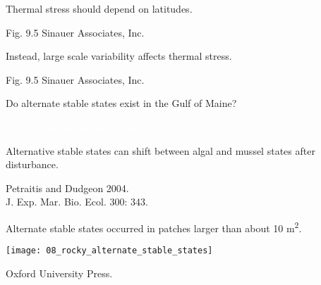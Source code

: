 \documentclass[t]{beamer}
\begin{document}
{
\begin{frame}[b]{Thermal stress should depend on latitudes.}

	\hfill \tiny Fig. 9.5 \textcopyright Sinauer Associates, Inc.
\end{frame}
}
%
{
\begin{frame}[b]{Instead, large scale variability affects thermal stress.}

	\hfill \tiny Fig. 9.5 \textcopyright Sinauer Associates, Inc.
\end{frame}
}
%
{
\begin{frame}[b]{Do alternate stable states exist in the Gulf of Maine?}

	\hfill \tiny \textcolor{white}{Fig. 9.7 \textcopyright Sinauer Associates, Inc.}
\end{frame}
}
%
{
\begin{frame}[b]{Alternative stable states can shift between algal and mussel states after disturbance.}

	\hfill \tiny Petraitis and Dudgeon 2004.\\ \hfill J. Exp. Mar. Bio. Ecol. 300: 343.
\end{frame}
}
%
\begin{frame}[t]{Alternate stable states occurred in patches larger than about 10 m\textsuperscript{2}.}


	\begin{center}
		\texttt{[image: 08\_rocky\_alternate\_stable\_states]} 
	\end{center}


	\vfilll

	\hfill \tiny \textcopyright Oxford University Press.

\end{frame}
%
\end{document}
